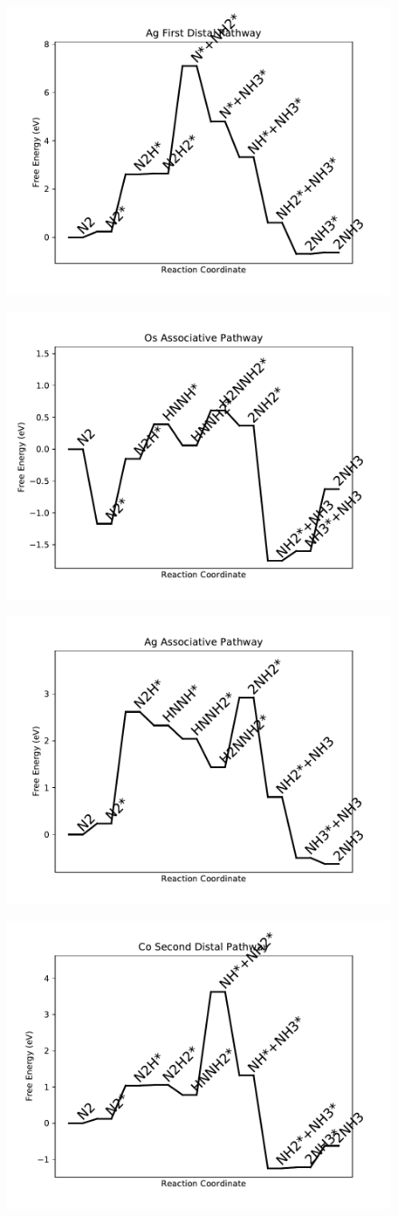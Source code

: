 \documentclass[journal=jacsat,manuscript=article]{achemso}
\begin{document}
\begin{figure}
\includegraphics[width=0.5\linewidth]{data/plots/Ag_distal_1.pdf}
\label{fig:Ag_distal_1}
\end{figure}

\newpage
\begin{figure}
\includegraphics[width=0.5\linewidth]{data/plots/Os_associative.pdf}
\label{fig:Os_associative}
\end{figure}

\begin{figure}
\includegraphics[width=0.5\linewidth]{data/plots/Ag_associative.pdf}
\label{fig:Ag_associative}
\end{figure}

\newpage
\begin{figure}
\includegraphics[width=0.5\linewidth]{data/plots/Co_distal_2.pdf}
\label{fig:Co_distal_2}
\end{figure}
\end{document}
